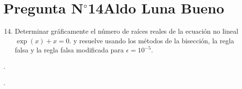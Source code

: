 \section{Pregunta N$^{\circ}$14\qquad Aldo Luna Bueno}

\begin{frame}
	\begin{enumerate}\setcounter{enumi}{13}
		\item

		      Determinar gráficamente el número de raíces reales de la
		      ecuación no lineal
		      \begin{math}
			      \exp\left(x\right)+x=
			      0.
		      \end{math}
					y resuelve usando los métodos de la bisección, la regla
					falsa y la regla falsa modificada para $\epsilon=10^{-5}$.

	\end{enumerate}

	\begin{solution}

		.
	\end{solution}
\end{frame}

\begin{frame}
	\begin{solution}

		.
	\end{solution}
\end{frame}